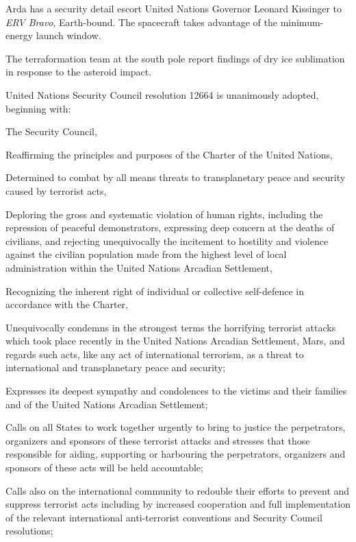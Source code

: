 Arda has a security detail escort United Nations Governor Leonard Kissinger to {\it ERV Bravo}, Earth-bound. The spacecraft takes advantage of the minimum-energy launch window.
\StopTimelineDate

The terraformation team at the south pole report findings of dry ice sublimation in response to the asteroid impact.
\StopTimelineDate

United Nations Security Council resolution 12664 is unanimously adopted, beginning with:

\startTimelineDocument
The Security Council,

Reaffirming the principles and purposes of the Charter of the United Nations,

Determined to combat by all means threats to transplanetary peace and security caused by terrorist acts,

Deploring the gross and systematic violation of human rights, including the repression of peaceful demonstrators, expressing deep concern at the deaths of civilians, and rejecting unequivocally the incitement to hostility and violence against the civilian population made from the highest level of local administration within the United Nations Arcadian Settlement,

Recognizing the inherent right of individual or collective self-defence in accordance with the Charter,

\startitemize[n]
\setupwhitespace[big]
\item Unequivocally condemns in the strongest terms the horrifying terrorist attacks which took place recently in the United Nations Arcadian Settlement, Mars, and regards such acts, like any act of international terrorism, as a threat to international and transplanetary peace and security;

\item Expresses its deepest sympathy and condolences to the victims and their families and of the United Nations Arcadian Settlement;

\item Calls on all States to work together urgently to bring to justice the perpetrators, organizers and sponsors of these terrorist attacks and stresses that those responsible for aiding, supporting or harbouring the perpetrators, organizers and sponsors of these acts will be held accountable;

\item Calls also on the international community to redouble their efforts to prevent and suppress terrorist acts including by increased cooperation and full implementation of the relevant international anti-terrorist conventions and Security Council resolutions;

